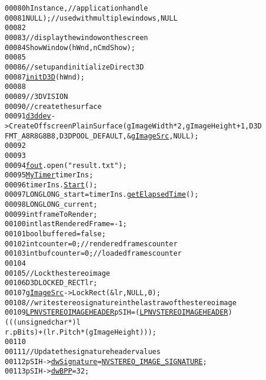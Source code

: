 \begin{footnotesize}
\begin{alltt}
00080                 hInstance,\textcolor{comment}{// application handle}
00081                 NULL);\textcolor{comment}{// used with multiple windows, NULL}
00082 
00083         \textcolor{comment}{// display the window on the screen}
00084         ShowWindow(hWnd, nCmdShow);
00085 
00086         \textcolor{comment}{// set up and initialize Direct3D}
00087         \hyperlink{main_8cpp_adc57d8d64e4c467f6818cddd81090db7}{initD3D}(hWnd);
00088 
00089         \textcolor{comment}{//3D VISION}
00090         \textcolor{comment}{// create the surface}
00091         \hyperlink{main_8cpp_a1c4528473f1127613d4edcaac0dad7f1}{d3ddev}->CreateOffscreenPlainSurface(gImageWidth *2, gImageHeight + 1, D3D
      FMT\_A8R8G8B8, D3DPOOL\_DEFAULT, &\hyperlink{main_8cpp_a35944f88a0c5556a08bd1da88b8d89db}{gImageSrc}, NULL);
00092 
00093 
00094         \hyperlink{config_8h_a0a2814a2252fee90794304506ef2e9c0}{fout}.open(\textcolor{stringliteral}{"result.txt"});
00095         \hyperlink{class_my_timer}{MyTimer} timerIns;
00096         timerIns.\hyperlink{class_my_timer_a74b18b409d493579f6b3d0972590a7a6}{Start}();
00097         LONGLONG \_start = timerIns.\hyperlink{class_my_timer_abd0f6728cf64f7b5d81235588bb8e3c2}{getElapsedTime}();
00098         LONGLONG \_current;
00099         \textcolor{keywordtype}{int} frameToRender;
00100         \textcolor{keywordtype}{int} lastRenderedFrame = -1;
00101         \textcolor{keywordtype}{bool} buffered = \textcolor{keyword}{false};
00102         \textcolor{keywordtype}{int} counter = 0;        \textcolor{comment}{// rendered frames counter}
00103         \textcolor{keywordtype}{int} bufcounter = 0;     \textcolor{comment}{// loaded frames counter}
00104 
00105         \textcolor{comment}{// Lock the stereo image}
00106         D3DLOCKED\_RECT lr;
00107         \hyperlink{main_8cpp_a35944f88a0c5556a08bd1da88b8d89db}{gImageSrc}->LockRect(&lr,NULL,0);
00108         \textcolor{comment}{// write stereo signature in the last raw of the stereo image}
00109         \hyperlink{struct___nv___stereo___image___header}{LPNVSTEREOIMAGEHEADER} pSIH = (\hyperlink{struct___nv___stereo___image___header}{LPNVSTEREOIMAGEHEADER})(((\textcolor{keywordtype}{unsigned} \textcolor{keywordtype}{char} *) l
      r.pBits) + (lr.Pitch * (gImageHeight)));
00110 
00111         \textcolor{comment}{// Update the signature header values}
00112         pSIH->\hyperlink{struct___nv___stereo___image___header_aac21b6be816ef3e6b98d1f1183263fd9}{dwSignature} = \hyperlink{utils_8h_a75d1758a6dea9bae825f3253943e334a}{NVSTEREO_IMAGE_SIGNATURE};
00113         pSIH->\hyperlink{struct___nv___stereo___image___header_a9a51ead5061c21601c50b0e1ee2be9a0}{dwBPP} = 32;

\end{alltt}
\end{footnotesize}
